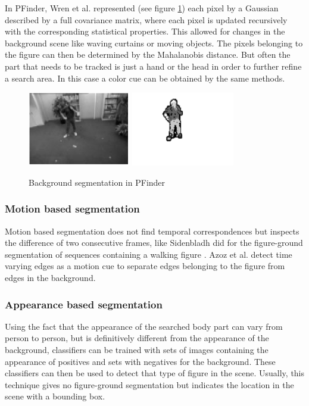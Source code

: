 In PFinder, Wren et al. \cite{Wren} represented (see figure \ref{fig:pfinder}) each pixel by a Gaussian described by a full covariance matrix, where each pixel is updated recursively with the corresponding statistical properties. This allowed for changes in the background scene like waving curtains or moving objects. The pixels belonging to the figure can then be determined by the Mahalanobis distance. %
But often the part that needs to be tracked is just a hand or the head in order to further refine a search area. In this case a color cue can be obtained by the same methods.
\begin{figure}[h!]
\center
\includegraphics[width=0.4\textwidth]{images/seminar/pfinder1.png}
\includegraphics[width=0.4\textwidth]{images/seminar/pfinder2.png}
\caption{Background segmentation in PFinder \cite{Wren}}
\label{fig:pfinder}
\end{figure}

\subsubsection{Motion based segmentation}
Motion based segmentation does not find temporal correspondences but inspects the difference of two consecutive frames, like Sidenbladh did for the figure-ground segmentation of sequences containing a walking figure \cite{Sidenbladh}. Azoz et al. detect time varying edges as a motion cue to separate edges belonging to the figure from edges in the background.

\subsubsection{Appearance based segmentation}
Using the fact that the appearance of the searched body part can vary from person to person, but is definitively different from the appearance of the background, classifiers can be trained with sets of images containing the appearance of positives and sets with negatives for the background. These classifiers can then be used to detect that type of figure in the scene. Usually, this technique gives no figure-ground segmentation but indicates the location in the scene with a bounding box. 

